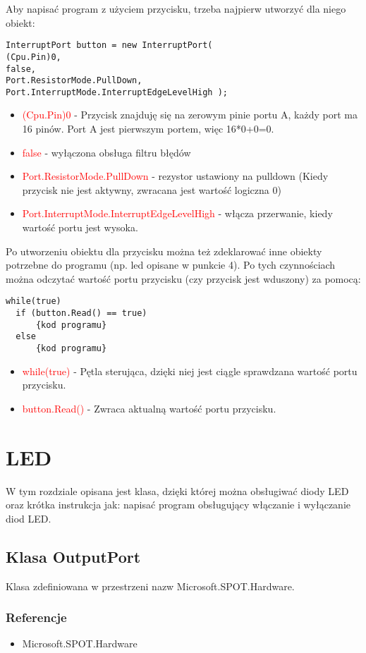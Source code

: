 \documentclass{article}
\begin{document}
Aby napisać program z użyciem przycisku, trzeba najpierw utworzyć dla niego obiekt:
\begin{lstlisting}[frame=single] 
InterruptPort button = new InterruptPort( 
(Cpu.Pin)0, 
false, 
Port.ResistorMode.PullDown,
Port.InterruptMode.InterruptEdgeLevelHigh );
\end{lstlisting}
\begin{itemize}
\item \textcolor{red}{(Cpu.Pin)0} - Przycisk znajduję się na zerowym pinie portu A, każdy port ma 16 pinów. Port A jest pierwszym portem, więc 16*0+0=0.
\item \textcolor{red}{false} - wyłączona obsługa filtru błędów
\item \textcolor{red}{Port.ResistorMode.PullDown} - rezystor ustawiony na pulldown (Kiedy przycisk nie jest aktywny, zwracana jest wartość logiczna 0)
\item \textcolor{red}{Port.InterruptMode.InterruptEdgeLevelHigh} - włącza przerwanie, kiedy wartość portu jest wysoka.
\end{itemize}
Po utworzeniu obiektu dla przycisku można też zdeklarować inne obiekty potrzebne do programu (np. led opisane w punkcie 4). Po tych czynnościach można odczytać wartość portu przycisku (czy przycisk jest wduszony) za pomocą:
\begin{lstlisting}[frame=single] 
while(true)
  if (button.Read() == true)
      {kod programu}
  else
      {kod programu}
\end{lstlisting}
\begin{itemize}
\item \textcolor{red}{while(true)} - Pętla sterująca, dzięki niej jest ciągle sprawdzana wartość portu przycisku.
\item \textcolor{red}{button.Read()} - Zwraca aktualną wartość portu przycisku.
\end{itemize}
 
 
\section{LED}
W tym rozdziale opisana jest klasa, dzięki której można obsługiwać diody LED oraz krótka instrukcja jak: napisać program obsługujący włączanie i wyłączanie diod LED.
\subsection{Klasa OutputPort}
Klasa zdefiniowana w przestrzeni nazw Microsoft.SPOT.Hardware.
\subsubsection{Referencje}
\begin{itemize}
\item Microsoft.SPOT.Hardware
\end{itemize}
\end{document}
